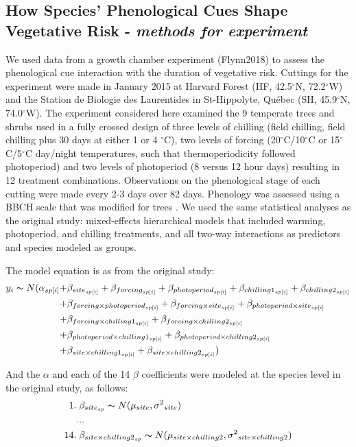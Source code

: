 \documentclass{article}\usepackage[]{graphicx}\usepackage[]{color}
\begin{document}
\subsection*{How Species' Phenological Cues Shape Vegetative Risk - \textit{methods for experiment}}
We used data from a growth chamber experiment (Flynn2018) to assess the phenological cue interaction with the duration of vegetative risk. Cuttings for the experiment were made in January 2015 at Harvard Forest (HF, 42.5$^{\circ}$N, 72.2$^{\circ}$W) and the Station de Biologie des Laurentides in St-Hippolyte, Qu\'ebec (SH, 45.9$^{\circ}$N, 74.0$^{\circ}$W). The experiment considered here examined the 9 temperate trees and shrubs used in a fully crossed design of three levels of chilling (field chilling, field chilling plus 30 days at either 1 or 4 $^{\circ}$C), two levels of forcing (20$^{\circ}$C/10$^{\circ}$C or 15$^{\circ}$C/5$^{\circ}$C day/night temperatures, such that thermoperiodicity followed photoperiod) and two levels of photoperiod (8 versus 12 hour days) resulting in 12 treatment combinations. Observations on the phenological stage of each cutting were made every 2-3 days over 82 days. Phenology was assessed using a BBCH scale that was modified for trees \citep{Finn2007}. We used the same statistical analyses as the original study: mixed-effects hierarchical models that included warming, photoperiod, and chilling treatments, and all two-way interactions as predictors and species modeled as groups.

The model equation is as from the original study:
\begin{align*}
y_i \thicksim N(\alpha_{sp[i]} +& \beta_{site_{sp[i]}} + \beta_{forcing_{sp[i]}} + \beta_{photoperiod_{sp[i]}} + \beta_{chilling1_{sp[i]}} + \beta_{chilling2_{sp[i]}}  \\
	+& \beta_{forcing \times photoperiod_{sp[i]}} + \beta_{forcing \times site_{sp[i]}} + \beta_{photoperiod \times site_{sp[i]}} \\
	+& \beta_{forcing  \times chilling1_{sp[i]}} + \beta_{forcing \times chilling2_{sp[i]}} \\
	+& \beta_{photoperiod \times chilling1_{sp[i]}} + \beta_{photoperiod \times chilling2_{sp[i]}} \\
	+& \beta_{site \times chilling1_{sp[i]}}  + \beta_{site \times chilling2_{sp[i]}} )
\end{align*}

\noindent And the $\alpha$ and each of the 14 $\beta$ coefficients were modeled at the species level in the original study, as follows:
\begin{align*}
1.& \; \beta_{site_{sp}} \thicksim N(\mu_{site}, \sigma{^2}_{site}) \\
   &... \\
14.& \; \beta_{site \times chilling2_{sp}} \thicksim N(\mu_{site \times chilling2}, \sigma{^2}_{site \times chilling2})
\end{align*}
\end{document}
